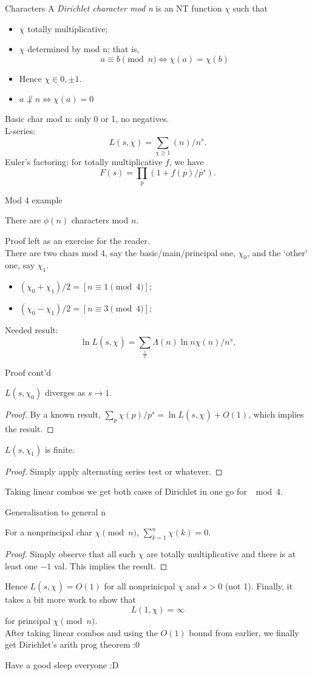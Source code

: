 \documentclass{xuan}
\def\infsum#1{\sum_{#1\ge1}}
\def\L#1{L(s,\chi_{#1})}
\begin{document}
\begin{frame}{Characters}
A {\itshape Dirichlet character mod n} is an NT function $\chi$ such that
\begin{itemize}
\item $\chi$ totally multiplicative;
\item $\chi$ determined by mod n; that is,
\[a\equiv b\pmod{n}\iff \chi(a)=\chi(b)\]
\item Hence $\chi\in{0,\pm1}$.
\item $a\not\perp n\iff\chi(a)=0$
\end{itemize}
Basic char mod n: only 0 or 1, no negatives.\\
L-series:
\[L(s,\chi)=\infsum\chi(n)/n^s.\]
Euler's factoring: for totally multiplicative $f$, we have 
\[F(s)=\prod_p(1+f(p)/p^s).\]
\end{frame}
\begin{frame}{Mod 4 example}
\begin{pt}[Lemma]
There are $\phi(n)$ characters mod $n$.
\end{pt}
Proof left as an exercise for the reader.
\\[4pt]
There are two chars mod 4, say the basic/main/principal one, $\chi_0$, and the `other' one, say $\chi_1$.
\begin{itemize}[label=*]
\item $(\chi_0+\chi_1)/2=[n\equiv 1\pmod4];$
\item $(\chi_0-\chi_1)/2=[n\equiv 3\pmod4];$
\end{itemize}
Needed result:
\[\ln\L{}=\infsum\frac{\Lambda(n)}{\ln n}\chi(n)/n^s.\]
\end{frame}
\begin{frame}{Proof cont'd}
\begin{pt}[Claim]
$\L{0}$ diverges as $s\to1$.
\end{pt}
\begin{proof}
By a known result, $\sum_p\chi(p)/p^s=\ln\L{}+O(1)$, which implies the result.
\end{proof}
\begin{pt}[Claim]
$\L1$ is finite.
\end{pt}
\begin{proof}
Simply apply alternating series test or whatever.
\end{proof}
Taking linear combos we get both cases of Dirichlet in one go for $\mod4$.
\end{frame}
\begin{frame}{Generalisation to general n}
\begin{pt}[Lemma]
For a nonprincipal char $\chi\pmod{n}$, $\sum_{k=1}^n\chi(k)=0.$
\end{pt}
\begin{proof}
Simply observe that all such $\chi$ are totally multiplicative and there is at least one $-1$ val. This implies the result.
\end{proof}
Hence $\L{}=O(1)$ for all nonprinicpal $\chi$ and $s>0$ (not 1).
Finally, it takes a bit more work to show that
\[L(1,\chi)=\infty\]
for principal $\chi\pmod{n}$.
\\[4pt]
After taking linear combos and using the $O(1)$ bound from earlier, we finally get Dirichlet's arith prog theorem :0
\end{frame} 	
\begin{frame}
\begin{pt}
Have a good sleep everyone :D
\end{pt}
\end{frame}
\end{document}
